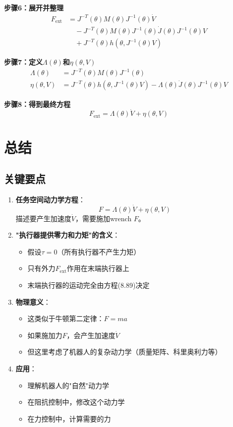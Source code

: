 \documentclass[12pt,a4paper]{article}
\begin{document}
\textbf{步骤6：展开并整理}
\begin{align}
F_{\text{ext}} &= J^{-T}(\theta)M(\theta)J^{-1}(\theta)\dot{V} \\
&\quad - J^{-T}(\theta)M(\theta)J^{-1}(\theta)\dot{J}(\theta)J^{-1}(\theta)V \\
&\quad + J^{-T}(\theta)h(\theta, J^{-1}(\theta)V)
\end{align}

\textbf{步骤7：定义$\Lambda(\theta)$和$\eta(\theta, V)$}
\begin{align}
\Lambda(\theta) &= J^{-T}(\theta)M(\theta)J^{-1}(\theta) \\
\eta(\theta, V) &= J^{-T}(\theta)h(\theta, J^{-1}(\theta)V) - \Lambda(\theta)\dot{J}(\theta)J^{-1}(\theta)V
\end{align}

\textbf{步骤8：得到最终方程}
\begin{equation}
F_{\text{ext}} = \Lambda(\theta)\dot{V} + \eta(\theta, V) \tag{8.89}
\end{equation}

\section{总结}

\subsection{关键要点}

\begin{enumerate}
\item \textbf{任务空间动力学方程}：
\begin{equation}
F = \Lambda(\theta)\dot{V} + \eta(\theta, V)
\end{equation}
描述要产生加速度$\dot{V}$，需要施加wrench $F$。

\item \textbf{"执行器提供零力和力矩"的含义}：
\begin{itemize}
\item 假设$\tau = 0$（所有执行器不产生力矩）
\item 只有外力$F_{\text{ext}}$作用在末端执行器上
\item 末端执行器的运动完全由方程(8.89)决定
\end{itemize}

\item \textbf{物理意义}：
\begin{itemize}
\item 这类似于牛顿第二定律：$F = ma$
\item 如果施加力$F$，会产生加速度$\dot{V}$
\item 但这里考虑了机器人的复杂动力学（质量矩阵、科里奥利力等）
\end{itemize}

\item \textbf{应用}：
\begin{itemize}
\item 理解机器人的"自然"动力学
\item 在阻抗控制中，修改这个动力学
\item 在力控制中，计算需要的力
\end{itemize}
\end{enumerate}
\end{document}
